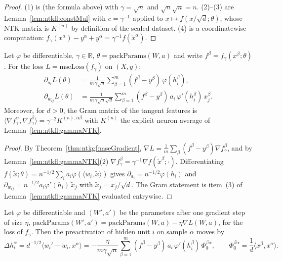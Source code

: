 \begin{proof}
  \leanok
(1) is (the formula above) with $\gamma=\sqrt n$ and $\sqrt n\sqrt n=n$. (2)--(3) are Lemma~\ref{lem:ntkfl:constMul} with $c=\gamma^{-1}$ applied to $x\mapsto f(x/\sqrt d;\theta)$, whose
NTK matrix is $K^{(n)}$ by definition of the scaled dataset. (4) is a coordinatewise computation: $f_\gamma(x^\alpha)-y^\alpha+y^\alpha=\gamma^{-1}f(\tilde x^\alpha)$.
\end{proof}

\begin{theorem}\label{thm:ntkfl:gradients}
  \leanok
Let $\varphi$ be differentiable, $\gamma\in\mathbb R$, $\theta=\mathrm{packParams}(W,a)$ and write
$f^\beta=f_\gamma(x^\beta;\theta)$. For the loss $L=\mathrm{mseLoss}(f_\gamma)$ on $(X,y)$:
\begin{align*}
  \partial_{a_i}L(\theta)&=\frac1{m\,\gamma\sqrt n}\sum_{\beta=1}^m(f^\beta-y^\beta)\,\varphi(h_i^\beta),\\
  \partial_{w_{ij}}L(\theta)&=\frac1{m\,\gamma\sqrt n\sqrt d}\sum_{\beta=1}^m(f^\beta-y^\beta)\,a_i\,\varphi'(h_i^\beta)\,x^\beta_j .
\end{align*}
Moreover, for $d>0$, the Gram matrix of the tangent features is
$\langle\nabla f_\gamma^\alpha,\nabla f_\gamma^\beta\rangle=\gamma^{-2}K^{(n),\alpha\beta}$ with $K^{(n)}$ the explicit neuron average of Lemma~\ref{lem:ntkfl:gammaNTK}.
\end{theorem}

\begin{proof}
  \leanok
By Theorem~\ref{thm:ntkgf:mseGradient}, $\nabla L=\frac1m\sum_\beta(f^\beta-y^\beta)\nabla f_\gamma^\beta$, and by Lemma~\ref{lem:ntkfl:gammaNTK}(2) $\nabla f_\gamma^\beta=\gamma^{-1}\nabla f(\tilde x^\beta;\cdot)$.
Differentiating $f(\tilde x;\theta)=n^{-1/2}\sum_ia_i\varphi(\langle w_i,\tilde x\rangle)$ gives $\partial_{a_i}=n^{-1/2}\varphi(h_i)$ and $\partial_{w_{ij}}=n^{-1/2}a_i\varphi'(h_i)\,\tilde x_j$ with $\tilde x_j=x_j/\sqrt d$. The Gram statement is item~(3) of Lemma~\ref{lem:ntkfl:gammaNTK}
evaluated entrywise.
\end{proof}

\begin{theorem}\label{thm:ntkfl:oneStep}
  \leanok
Let $\varphi$ be differentiable and $(W',a')$ be the parameters after one gradient step of size $\eta$,
$\mathrm{packParams}(W',a')=\mathrm{packParams}(W,a)-\eta\nabla L(W,a)$, for the loss of $f_\gamma$. Then the preactivation of hidden unit $i$ on sample $\alpha$
moves by
\[
  \Delta h_i^\alpha=d^{-1/2}\langle w_i'-w_i,x^\alpha\rangle=-\frac{\eta}{m\gamma\sqrt n}\sum_{\beta=1}^m(f^\beta-y^\beta)\,a_i\,\varphi'(h_i^\beta)\,\Phi_0^{\beta\alpha},
  \qquad\Phi_0^{\beta\alpha}=\frac1d\langle x^\beta,x^\alpha\rangle .
\]
\end{theorem}

